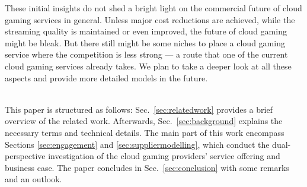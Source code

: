 These initial insights do not shed a bright light on the commercial future of cloud gaming services in general. Unless major cost reductions are achieved, while the streaming quality is maintained or even improved, the future of cloud gaming might be bleak. But there still might be some niches to place a cloud gaming service where the competition is less strong --- a route that one of the current cloud gaming services already takes. We plan to take a deeper look at all these aspects and provide more detailed models in the future.

~\\
This paper is structured as follows: Sec.~\ref{sec:relatedwork} provides a brief overview of the related work. Afterwards, Sec.~\ref{sec:background} explains the necessary terms and technical details. The main part of this work encompass Sections \ref{sec:engagement} and \ref{sec:suppliermodelling}, which conduct the dual-perspective investigation of the cloud gaming providers' service offering and business case. The paper concludes in Sec.~\ref{sec:conclusion} with some remarks and an outlook.



